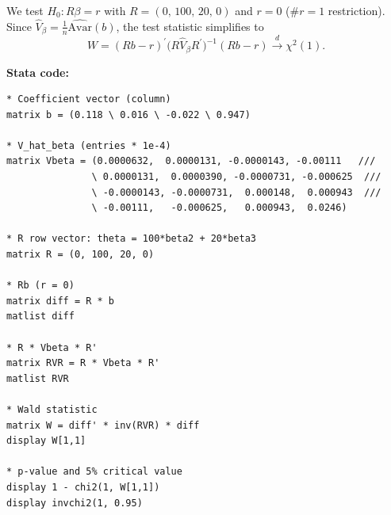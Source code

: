 \documentclass[a4paper]{article}
\begin{document}
\begin{enumerate}
\begin{enumerate}
                    We test $H_0: R\beta = r$ with $R = (0,\, 100,\, 20,\, 0)$ and $r = 0$
                    ($\#r = 1$ restriction). Since
                    $\hat{V}_\beta = \frac{1}{n}\widehat{\mathrm{Avar}}(b)$,
                    the test statistic simplifies to
                    \[
                        W = (Rb - r)^\prime
                        \bigl(R\hat{V}_\beta R^\prime\bigr)^{-1}
                        (Rb - r)
                        \xrightarrow{d} \chi^2(1).
                    \]

                    \textbf{Stata code:}

                    \begin{lstlisting}[style=stata]
* Coefficient vector (column)
matrix b = (0.118 \ 0.016 \ -0.022 \ 0.947)

* V_hat_beta (entries * 1e-4)
matrix Vbeta = (0.0000632,  0.0000131, -0.0000143, -0.00111   ///
               \ 0.0000131,  0.0000390, -0.0000731, -0.000625  ///
               \ -0.0000143, -0.0000731,  0.000148,  0.000943  ///
               \ -0.00111,   -0.000625,   0.000943,  0.0246)

* R row vector: theta = 100*beta2 + 20*beta3
matrix R = (0, 100, 20, 0)

* Rb (r = 0)
matrix diff = R * b
matlist diff

* R * Vbeta * R'
matrix RVR = R * Vbeta * R'
matlist RVR

* Wald statistic
matrix W = diff' * inv(RVR) * diff
display W[1,1]

* p-value and 5% critical value
display 1 - chi2(1, W[1,1])
display invchi2(1, 0.95)
                    \end{lstlisting}


          \end{enumerate}

\end{enumerate}
\end{document}
